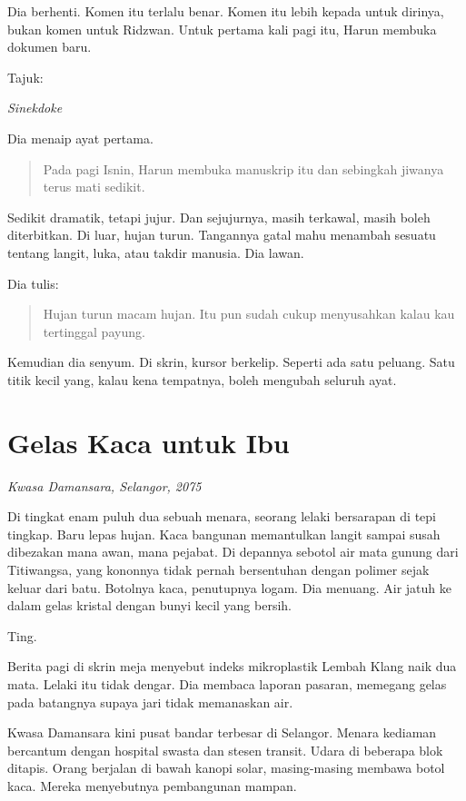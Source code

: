 \documentclass[
  11pt,
  a5paper,
  openany,
  oneside]{book}
\begin{document}
Dia berhenti. Komen itu terlalu benar. Komen itu lebih kepada untuk
dirinya, bukan komen untuk Ridzwan. Untuk pertama kali pagi itu, Harun
membuka dokumen baru.

Tajuk:

\emph{Sinekdoke}

Dia menaip ayat pertama.

\begin{quote}
Pada pagi Isnin, Harun membuka manuskrip itu dan sebingkah jiwanya terus
mati sedikit.
\end{quote}

Sedikit dramatik, tetapi jujur. Dan sejujurnya, masih terkawal, masih
boleh diterbitkan. Di luar, hujan turun. Tangannya gatal mahu menambah
sesuatu tentang langit, luka, atau takdir manusia. Dia lawan.

Dia tulis:

\begin{quote}
Hujan turun macam hujan. Itu pun sudah cukup menyusahkan kalau kau
tertinggal payung.
\end{quote}

Kemudian dia senyum. Di skrin, kursor berkelip. Seperti ada satu
peluang. Satu titik kecil yang, kalau kena tempatnya, boleh mengubah
seluruh ayat.

\chapter{Gelas Kaca untuk Ibu}\label{gelas-kaca-untuk-ibu}

\emph{Kwasa Damansara, Selangor, 2075}

Di tingkat enam puluh dua sebuah menara, seorang lelaki bersarapan di
tepi tingkap. Baru lepas hujan. Kaca bangunan memantulkan langit sampai
susah dibezakan mana awan, mana pejabat. Di depannya sebotol air mata
gunung dari Titiwangsa, yang kononnya tidak pernah bersentuhan dengan
polimer sejak keluar dari batu. Botolnya kaca, penutupnya logam. Dia
menuang. Air jatuh ke dalam gelas kristal dengan bunyi kecil yang
bersih.

Ting.

Berita pagi di skrin meja menyebut indeks mikroplastik Lembah Klang naik
dua mata. Lelaki itu tidak dengar. Dia membaca laporan pasaran, memegang
gelas pada batangnya supaya jari tidak memanaskan air.

Kwasa Damansara kini pusat bandar terbesar di Selangor. Menara kediaman
bercantum dengan hospital swasta dan stesen transit. Udara di beberapa
blok ditapis. Orang berjalan di bawah kanopi solar, masing-masing
membawa botol kaca. Mereka menyebutnya pembangunan mampan.
\end{document}
